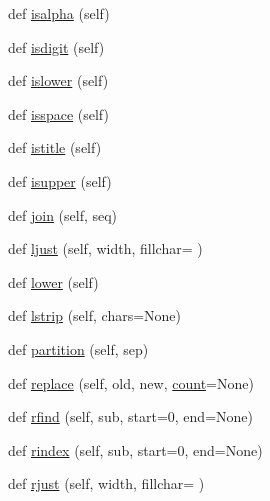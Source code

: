 \begin{DoxyCompactItemize}
def \hyperlink{classnumpy_1_1core_1_1defchararray_1_1chararray_a43b49d7a0813bb4665e3b42d2c182819}{isalpha} (self)
\item 
def \hyperlink{classnumpy_1_1core_1_1defchararray_1_1chararray_afb2a4694929d8dfc4ce3b6e2ac2e0880}{isdigit} (self)
\item 
def \hyperlink{classnumpy_1_1core_1_1defchararray_1_1chararray_a3b792f2fd5d25aa1db29a0bf484e2c18}{islower} (self)
\item 
def \hyperlink{classnumpy_1_1core_1_1defchararray_1_1chararray_adaabb118f02d4252fb43d22d0348ccad}{isspace} (self)
\item 
def \hyperlink{classnumpy_1_1core_1_1defchararray_1_1chararray_a810bd28a787ccc98a71f341f2b60f251}{istitle} (self)
\item 
def \hyperlink{classnumpy_1_1core_1_1defchararray_1_1chararray_ab015e822025967f8172b8a40e7bf4fe0}{isupper} (self)
\item 
def \hyperlink{classnumpy_1_1core_1_1defchararray_1_1chararray_aeaf4f4f2854d3aaffd4f7bcf857eab8c}{join} (self, seq)
\item 
def \hyperlink{classnumpy_1_1core_1_1defchararray_1_1chararray_ad5520990486134357f1d18d4fde6eb9f}{ljust} (self, width, fillchar=\textquotesingle{} \textquotesingle{})
\item 
def \hyperlink{classnumpy_1_1core_1_1defchararray_1_1chararray_a3378c7342f79649daf5d722451867a0c}{lower} (self)
\item 
def \hyperlink{classnumpy_1_1core_1_1defchararray_1_1chararray_a3bb99f7adfcadf1448b1c3c4fb65782f}{lstrip} (self, chars=None)
\item 
def \hyperlink{classnumpy_1_1core_1_1defchararray_1_1chararray_a3c2a6ecc52e4c77623cf43a1fb5c6334}{partition} (self, sep)
\item 
def \hyperlink{classnumpy_1_1core_1_1defchararray_1_1chararray_a69ff2f9e4159f0fc659ce82a94a10da8}{replace} (self, old, new, \hyperlink{classnumpy_1_1core_1_1defchararray_1_1chararray_aa845a74f5ff5dce950aa07a672eb676f}{count}=None)
\item 
def \hyperlink{classnumpy_1_1core_1_1defchararray_1_1chararray_afed9d14d9fbe53614c033e5548c5e63b}{rfind} (self, sub, start=0, end=None)
\item 
def \hyperlink{classnumpy_1_1core_1_1defchararray_1_1chararray_a669f4b13f8b74841b6499fb1632616b8}{rindex} (self, sub, start=0, end=None)
\item 
def \hyperlink{classnumpy_1_1core_1_1defchararray_1_1chararray_a48735eefda75be92386355cae71b5dfe}{rjust} (self, width, fillchar=\textquotesingle{} \textquotesingle{})

\end{DoxyCompactItemize}
